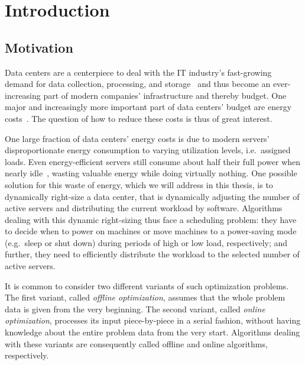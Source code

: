 
\chapter{Introduction}
\section{Motivation}
Data centers are a centerpiece to deal with the IT industry's fast-growing demand for data collection, processing, and storage~\parencite{cisco} and thus become an ever-increasing part of modern companies' infrastructure and thereby budget. One major and increasingly more important part of data centers' budget are energy costs~\parencite{hamilton}. The question of how to reduce these costs is thus of great interest.

One large fraction of data centers' energy costs is due to modern servers' disproportionate energy consumption to varying utilization levels, i.e.\ assigned loads. Even energy-efficient servers still consume about half their full power when nearly idle~\parencite{barroso}, wasting valuable energy while doing virtually nothing. One possible solution for this waste of energy, which we will address in this thesis, is to dynamically right-size a data center, that is dynamically adjusting the number of active servers and distributing the current workload by software. Algorithms dealing with this dynamic right-sizing thus face a scheduling problem: they have to decide when to power on machines or move machines to a power-saving mode (e.g.~sleep or shut down) during periods of high or low load, respectively; and further, they need to efficiently distribute the workload to the selected number of active servers.

It is common to consider two different variants of such optimization problems. The first variant, called \emph{offline optimization}, assumes that the whole problem data is given from the very beginning. The second variant, called \emph{online optimization}, processes its input piece-by-piece in a serial fashion, without having knowledge about the entire problem data from the very start. Algorithms dealing with these variants are consequently called offline and online algorithms, respectively.

